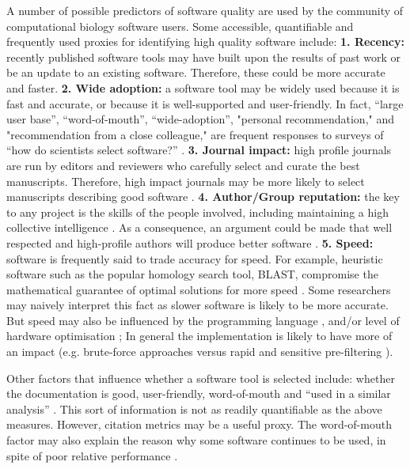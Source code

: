 \documentclass[fleqn,10pt]{SelfArx} %
\begin{document}
A number of possible predictors of software quality are used by the community of computational biology software users. Some accessible, quantifiable and frequently used proxies for identifying high quality software include: \textbf{1. Recency:} recently published software tools may have built upon the results of past work or be an update to an existing software. Therefore, these could be more accurate and faster. \textbf{2. Wide adoption:} a software tool may be widely used because it is fast and accurate, or because it is well-supported and user-friendly. In fact, “large user base”, “word-of-mouth”, “wide-adoption”, "personal recommendation," and "recommendation from a close colleague," are frequent responses to surveys of “how do scientists select software?” \cite{Hannay2009-cf,Joppa2013-vj,Loman2015-bw}. \textbf{3. Journal impact:} high profile journals are run by editors and reviewers who carefully select and curate the best manuscripts. Therefore, high impact journals may be more likely to select manuscripts describing good software \cite{Garfield1955-wf}. \textbf{4. Author/Group reputation:} the key to any project is the skills of the people involved, including maintaining a high collective intelligence \cite{Joppa2013-vj,Woolley2010-ld,Cheruvelil2014-xn}. As a consequence, an argument could be made that well respected and high-profile authors will produce better software \cite{Hirsch2005-mt,Bornmann2008-il}. \textbf{5. Speed:} software is frequently said to trade accuracy for speed. For example, heuristic software such as the popular homology search tool, BLAST, compromise the mathematical guarantee of optimal solutions for more speed \cite{Altschul1990-ht,Altschul1997-ga}. Some researchers may naively interpret this fact as slower software is likely to be more accurate. But speed may also be influenced by the programming language \cite{Fourment2008-vl}, and/or level of hardware optimisation \cite{Farrar2007-ky,Dematte2010-ph}; In general the implementation is likely to have more of an impact (e.g. brute-force approaches versus rapid and sensitive pre-filtering \cite{Schaeffer1989-mu,Papadimitriou_undated-bo}).

Other factors that influence whether a software tool is selected include: whether the documentation is good, user-friendly, word-of-mouth and ``used in a similar analysis'' \cite{Loman2015-bw}. This sort of information is not as readily quantifiable as the above measures. However, citation metrics may be a useful proxy. The word-of-mouth factor may also explain the reason why some software continues to be used, in spite of poor relative performance \cite{Wadi2016-dj}.
\end{document}
